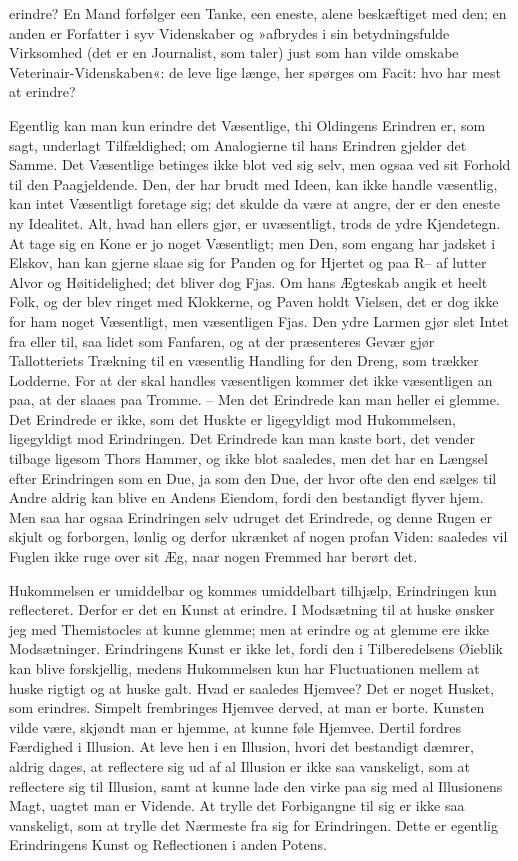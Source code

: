 \documentclass[12pt,a4paper]{article}
\begin{document}
erindre? En Mand forfølger een Tanke, een eneste, alene beskæftiget med den; en anden er Forfatter i syv Videnskaber og »afbrydes i sin betydningsfulde Virksomhed (det er en Journalist, som taler) just som han vilde omskabe Veterinair-Videnskaben«: de leve lige længe, her spørges om Facit: hvo har mest at erindre?

Egentlig kan man kun erindre det Væsentlige, thi Oldingens Erindren er, som sagt, underlagt Tilfældighed; om Analogierne til hans Erindren gjelder det Samme. Det Væsentlige betinges ikke blot ved sig selv, men ogsaa ved sit Forhold til den Paagjeldende. Den, der har brudt med Ideen, kan ikke handle væsentlig, kan intet Væsentligt foretage sig; det skulde da være at angre, der er den eneste ny Idealitet. Alt, hvad han ellers gjør, er uvæsentligt, trods de ydre Kjendetegn. At tage sig en Kone er jo noget Væsentligt; men Den, som engang har jadsket i Elskov, han kan gjerne slaae sig for Panden og for Hjertet og paa R– af lutter Alvor og Høitidelighed; det bliver dog Fjas. Om hans Ægteskab angik et heelt Folk, og der blev ringet med Klokkerne, og Paven holdt Vielsen, det er dog ikke for ham noget Væsentligt, men væsentligen Fjas. Den ydre Larmen gjør slet Intet fra eller til, saa lidet som Fanfaren, og at der præsenteres Gevær gjør Tallotteriets Trækning til en væsentlig Handling for den Dreng, som trækker Lodderne. For at der skal handles væsentligen kommer det ikke væsentligen an paa, at der slaaes paa Tromme. – Men det Erindrede kan man heller ei glemme. Det Erindrede er ikke, som det Huskte er ligegyldigt mod Hukommelsen, ligegyldigt mod Erindringen. Det Erindrede kan man kaste bort, det vender tilbage ligesom Thors Hammer, og ikke blot saaledes, men det har en Længsel efter Erindringen som en Due, ja som den Due, der hvor ofte den end sælges til Andre aldrig kan blive en Andens Eiendom, fordi den bestandigt flyver hjem. Men saa har ogsaa Erindringen selv udruget det Erindrede, og denne Rugen er skjult og forborgen, lønlig og derfor ukrænket af nogen profan Viden: saaledes vil Fuglen ikke ruge over sit Æg, naar nogen Fremmed har berørt det.

Hukommelsen er umiddelbar og kommes umiddelbart tilhjælp, Erindringen kun reflecteret. Derfor er det en Kunst at erindre. I Modsætning til at huske ønsker jeg med Themistocles at kunne glemme; men at erindre og at glemme ere ikke Modsætninger. Erindringens Kunst er ikke let, fordi den i Tilberedelsens Øieblik kan blive forskjellig, medens Hukommelsen kun har Fluctuationen mellem at huske rigtigt og at huske galt. Hvad er saaledes Hjemvee? Det er noget Husket, som erindres. Simpelt frembringes Hjemvee derved, at man er borte. Kunsten vilde være, skjøndt man er hjemme, at kunne føle Hjemvee. Dertil fordres Færdighed i Illusion. At leve hen i en Illusion, hvori det bestandigt dæmrer, aldrig dages, at reflectere sig ud af al Illusion er ikke saa vanskeligt, som at reflectere sig til Illusion, samt at kunne lade den virke paa sig med al Illusionens Magt, uagtet man er Vidende. At trylle det Forbigangne til sig er ikke saa vanskeligt, som at trylle det Nærmeste fra sig for Erindringen. Dette er egentlig Erindringens Kunst og Reflectionen i anden Potens.
\end{document}
